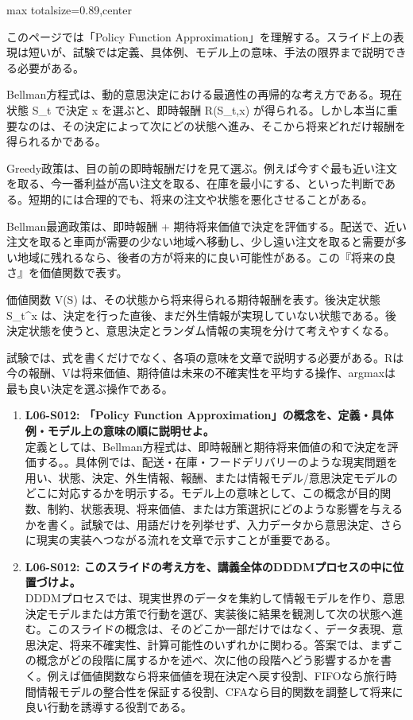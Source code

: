 \begin{minipage}[t]{0.58\textwidth}
\begin{adjustbox}{max totalsize={\textwidth}{0.89\textheight},center}
\begin{minipage}{\textwidth}\scriptsize
{}このページでは「Policy Function Approximation」を理解する。スライド上の表現は短いが、試験では定義、具体例、モデル上の意味、手法の限界まで説明できる必要がある。\par
Bellman方程式は、動的意思決定における最適性の再帰的な考え方である。現在状態 S\_t で決定 x を選ぶと、即時報酬 R(S\_t,x) が得られる。しかし本当に重要なのは、その決定によって次にどの状態へ進み、そこから将来どれだけ報酬を得られるかである。\par
Greedy政策は、目の前の即時報酬だけを見て選ぶ。例えば今すぐ最も近い注文を取る、今一番利益が高い注文を取る、在庫を最小にする、といった判断である。短期的には合理的でも、将来の注文や状態を悪化させることがある。\par
Bellman最適政策は、即時報酬 + 期待将来価値で決定を評価する。配送で、近い注文を取ると車両が需要の少ない地域へ移動し、少し遠い注文を取ると需要が多い地域に残れるなら、後者の方が将来的に良い可能性がある。この『将来の良さ』を価値関数で表す。\par
価値関数 V(S) は、その状態から将来得られる期待報酬を表す。後決定状態 S\_t\textasciicircum{}x は、決定を行った直後、まだ外生情報が実現していない状態である。後決定状態を使うと、意思決定とランダム情報の実現を分けて考えやすくなる。\par
試験では、式を書くだけでなく、各項の意味を文章で説明する必要がある。Rは今の報酬、Vは将来価値、期待値は未来の不確実性を平均する操作、argmaxは最も良い決定を選ぶ操作である。\par{}\begin{enumerate}\item \textbf{L06-S012: 「Policy Function Approximation」の概念を、定義・具体例・モデル上の意味の順に説明せよ。}\\定義としては、Bellman方程式は、即時報酬と期待将来価値の和で決定を評価する。。具体例では、配送・在庫・フードデリバリーのような現実問題を用い、状態、決定、外生情報、報酬、または情報モデル/意思決定モデルのどこに対応するかを明示する。モデル上の意味として、この概念が目的関数、制約、状態表現、将来価値、または方策選択にどのような影響を与えるかを書く。試験では、用語だけを列挙せず、入力データから意思決定、さらに現実の実装へつながる流れを文章で示すことが重要である。\item \textbf{L06-S012: このスライドの考え方を、講義全体のDDDMプロセスの中に位置づけよ。}\\DDDMプロセスでは、現実世界のデータを集約して情報モデルを作り、意思決定モデルまたは方策で行動を選び、実装後に結果を観測して次の状態へ進む。このスライドの概念は、そのどこか一部だけではなく、データ表現、意思決定、将来不確実性、計算可能性のいずれかに関わる。答案では、まずこの概念がどの段階に属するかを述べ、次に他の段階へどう影響するかを書く。例えば価値関数なら将来価値を現在決定へ戻す役割、FIFOなら旅行時間情報モデルの整合性を保証する役割、CFAなら目的関数を調整して将来に良い行動を誘導する役割である。\end{enumerate}

\end{minipage}
\end{adjustbox}
\end{minipage}

